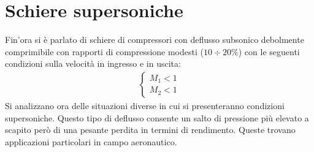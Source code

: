 \section{Schiere supersoniche}
Fin'ora si è parlato di schiere di compressori con deflusso subsonico debolmente comprimibile con rapporti di compressione modesti ($10 \div 20 \%$) con le seguenti condizioni sulla velocità in ingresso e in uscita:
\begin{align*}
\begin{cases}
M_1 <1\\
M_2 <1
\end{cases}
\end{align*} 
Si analizzano ora delle situazioni diverse in cui si presenteranno condizioni supersoniche. Questo tipo di deflusso consente un salto di pressione più elevato a scapito però di una pesante perdita in termini di rendimento. Queste trovano applicazioni particolari in campo aeronautico. 
